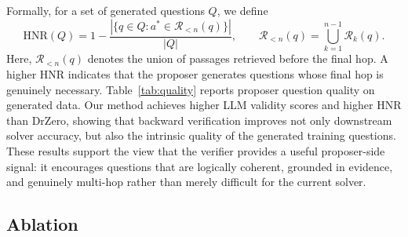 \documentclass{article}
\begin{document}
Formally, for a set of generated questions $Q$, we define
\[
\mathrm{HNR}(Q)
=
1 -
\frac{
\left|\{q\in Q : a^\ast \in \mathcal{R}_{<n}(q)\}\right|
}{
|Q|
},
\qquad
\mathcal{R}_{<n}(q)
=
\bigcup_{k=1}^{n-1}
\mathcal{R}_k(q).
\]
Here, $\mathcal{R}_{<n}(q)$ denotes the union of passages retrieved before the
final hop. A higher HNR indicates that the proposer generates questions whose
final hop is genuinely necessary.
Table~\ref{tab:quality} reports proposer question quality on generated data.
Our method achieves higher LLM validity scores and higher HNR than DrZero,
showing that backward verification improves not only downstream solver
accuracy, but also the intrinsic quality of the generated training questions.
These results support the view that the verifier provides a useful
proposer-side signal: it encourages questions that are logically coherent,
grounded in evidence, and genuinely multi-hop rather than merely difficult for
the current solver.
\begin{table}[t]
\centering
\caption{Proposer question quality on generated data (iterations 1--3).
LLM-Valid reports the average validity score (converted to \%) assigned by each judge and their mean (Avg.); scores range from 0 to 100.
Iteration~1 is identical for both methods (shared initialization).}
\label{tab:quality}
\tiny
\renewcommand{\arraystretch}{0.4}
\renewcommand{\arraystretch}{1.0}
\end{table}


\subsection{Ablation}
\end{document}
